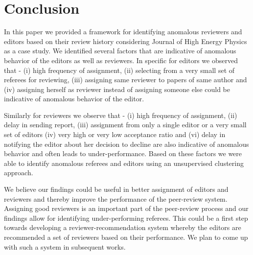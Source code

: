 \noindent
\section{Conclusion}
\label{conclusion}

In this paper we provided a framework for identifying anomalous reviewers and editors based on  their review history considering Journal of High Energy Physics as a case study. We identified several factors that are indicative of anomalous behavior of the editors as well as reviewers. In specific for editors we observed that - 
(i) high frequency of assignment, (ii) selecting from a very small set of referees for reviewing, (iii) assigning same reviewer to papers of same author and (iv) assigning herself as reviewer instead of assigning someone else could be indicative of anomalous behavior of the editor. 

Similarly for reviewers we observe that - 
(i) high frequency of assignment, (ii) delay in sending report, (iii) assignment from only a single editor or a very small set of editors (iv) 
very high or very low acceptance ratio and (vi) delay in notifying the editor about her decision to decline are also indicative of anomalous behavior and often leads to under-performance. Based on these factors we were able to identify anomalous referees and editors using an unsupervised clustering approach. 

 We believe our findings could be useful in better assignment of editors and reviewers and thereby improve the performance of the peer-review system. Assigning good reviewers is an important part of the peer-review process and our findings allow for identifying under-performing referees. This could be a first step towards developing a reviewer-recommendation system whereby the editors are recommended a set of reviewers based on their performance. 
We plan to come up with such a system in subsequent works.
